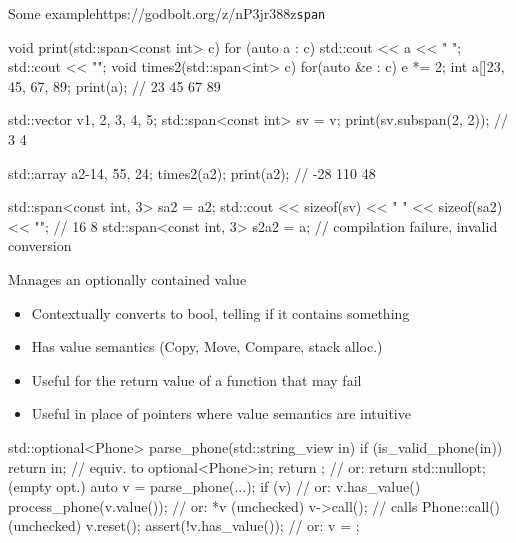 \begin{frame}[fragile]
  \begin{exampleblockGB}{Some example}{https://godbolt.org/z/nP3jr388z}{\texttt{span}}
    \scriptsize
    \begin{cppcode*}{}
      void print(std::span<const int> c) {
        for (auto a : c) { std::cout << a << " "; }
        std::cout << "\n";
      }
      void times2(std::span<int> c) {
        for(auto &e : c) { e *= 2; }
      }
      int a[]{23, 45, 67, 89};
      print(a);                 // 23 45 67 89

      std::vector v{1, 2, 3, 4, 5};
      std::span<const int> sv = v;
      print(sv.subspan(2, 2));  // 3 4

      std::array a2{-14, 55, 24};
      times2(a2);
      print(a2);                // -28 110 48

      std::span<const int, 3> sa2 = a2;
      std::cout << sizeof(sv) << " " << sizeof(sa2) << "\n";  // 16 8
      std::span<const int, 3> s2a2 = a; // compilation failure, invalid conversion
    \end{cppcode*}
  \end{exampleblockGB}
\end{frame}

\begin{frame}[fragile]
  \begin{block}{Manages an optionally contained value}
    \begin{itemize}
    \item Contextually converts to bool, telling if it contains something
    \item Has value semantics (Copy, Move, Compare, stack alloc.)
    \item Useful for the return value of a function that may fail
    \item Useful in place of pointers where value semantics are intuitive
    \end{itemize}
  \end{block}
  \begin{exampleblock}{}
    \small
    \begin{cppcode*}{}
      std::optional<Phone> parse_phone(std::string_view in) {
        if (is_valid_phone(in))
          return in; // equiv. to optional<Phone>{in};
        return {};   // or: return std::nullopt; (empty opt.)
      }
      auto v = parse_phone(...);
      if (v) {                    // or: v.has_value()
        process_phone(v.value()); // or: *v (unchecked)
        v->call(); // calls Phone::call()   (unchecked)
      }
      v.reset(); assert(!v.has_value()); // or: v = {};
    \end{cppcode*}
  \end{exampleblock}
\end{frame}

